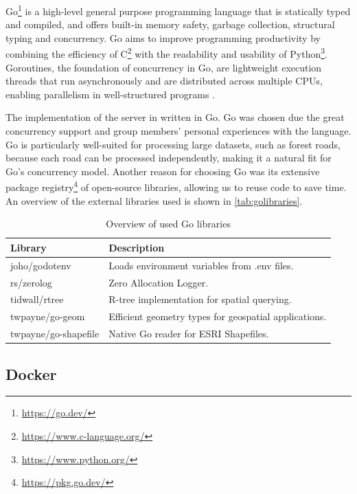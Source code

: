 Go\footnote{\url{https://go.dev/}} is a high-level general purpose programming language that is statically typed and compiled, and offers built-in memory safety, garbage collection, structural typing and concurrency. Go aims to improve programming productivity by combining the efficiency of C\footnote{\url{https://www.c-language.org/}} with the readability and usability of Python\footnote{\url{https://www.python.org/}}. Goroutines, the foundation of concurrency in Go, are lightweight execution threads that run asynchronously and are distributed across multiple CPUs, enabling parallelism in well-structured programs \cite{goproglanguage}.

The implementation of the server in written in Go. Go was chosen due the great concurrency support and group members' personal experiences with the language. Go is particularly well-suited for processing large datasets, such as forest roads, because each road can be processed independently, making it a natural fit for Go's concurrency model. Another reason for choosing Go was its extensive package registry\footnote{\url{https://pkg.go.dev/}} of open-source libraries, allowing us to reuse code to save time. An overview of the external libraries used is shown in \autoref{tab:golibraries}. 

\begin{table}[h]
    \centering
    \begin{tabular}{|l|l|}
        \hline
        \textbf{Library} & \textbf{Description} \\
        \hline
        joho/godotenv & Loads environment variables from .env files. \\
        rs/zerolog & Zero Allocation Logger. \\
        tidwall/rtree & R-tree implementation for spatial querying. \\
        twpayne/go-geom & Efficient geometry types for geospatial applications. \\
        twpayne/go-shapefile & Native Go reader for ESRI Shapefiles. \\
        \hline
    \end{tabular}
    \caption{Overview of used Go libraries}
    \label{tab:golibraries}
\end{table}

\subsection{Docker}\label{subsec:implementation:technologies:docker}

